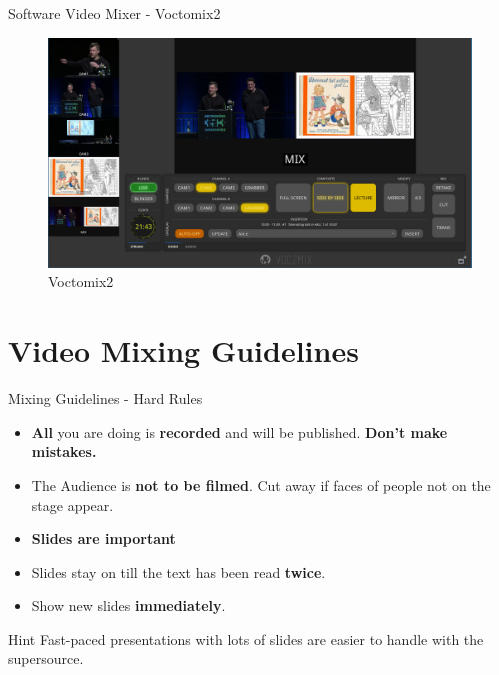 \documentclass[aspectratio=169]{beamer}
\begin{document}
\begin{frame}{Software Video Mixer - Voctomix2}%
	\begin{figure} 
		\centering
		\includegraphics[width=.9\textwidth]{images/voctomix2_3.png}%
		\caption{Voctomix2}
	\end{figure}
\end{frame}




\section{Video Mixing Guidelines}
\begin{frame}{Mixing Guidelines - Hard Rules}
	\begin{itemize}
		\item \textbf{All} you are doing is \textbf{recorded} and will be published. \alert{\textbf{Don't make mistakes.}}
		\item The Audience is \textbf{not to be filmed}. Cut away if faces of people not on the stage appear.
		\item \textbf{Slides are important}
		\item Slides stay on till the text has been read \textbf{twice}.
		\item Show new slides \textbf{immediately}.
	\end{itemize}
	\begin{exampleblock}{Hint}
		Fast-paced presentations with lots of slides are easier to handle with the supersource.
	\end{exampleblock}
\end{frame}
\end{document}
